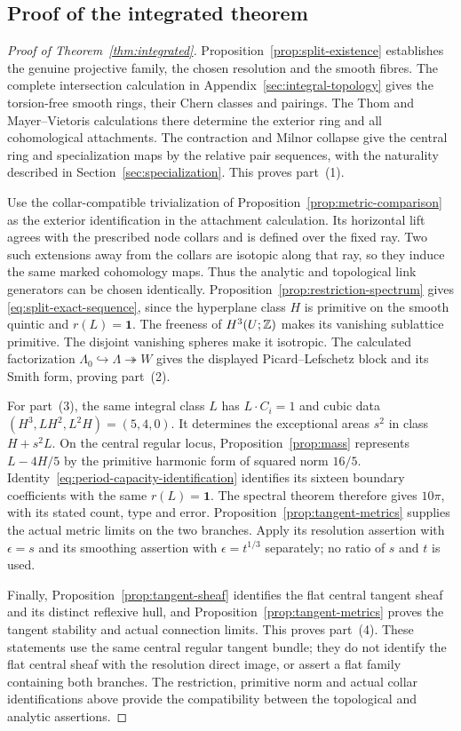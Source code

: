 \subsection{Proof of the integrated theorem}
\begin{proof}[Proof of Theorem~\ref{thm:integrated}]
Proposition~\ref{prop:split-existence} establishes the genuine projective
family, the chosen resolution and the smooth fibres. The complete
intersection calculation in Appendix~\ref{sec:integral-topology} gives the
torsion-free smooth rings, their Chern classes and pairings. The Thom
and Mayer--Vietoris calculations there determine the exterior ring and
all cohomological attachments. The contraction and Milnor collapse
give the central ring and specialization maps by the relative pair
sequences, with the naturality described in
Section~\ref{sec:specialization}. This proves part~(1).

Use the collar-compatible trivialization of
Proposition~\ref{prop:metric-comparison} as the exterior identification
in the attachment calculation. Its horizontal lift agrees with the
prescribed node collars and is defined over the fixed ray. Two such
extensions away from the collars are isotopic along that ray, so they
induce the same marked cohomology maps. Thus the analytic and
topological link generators can be chosen identically.
Proposition~\ref{prop:restriction-spectrum} gives
\eqref{eq:split-exact-sequence}, since the hyperplane class $H$ is
primitive on the smooth quintic and $r(L)=\mathbf1$.
The freeness of $H^3(U;\mathbb Z)$ makes its vanishing sublattice primitive.
The disjoint vanishing spheres make it isotropic. The calculated
factorization $\Lambda_0\hookrightarrow\Lambda\twoheadrightarrow W$ gives
the displayed Picard--Lefschetz block and its Smith form, proving
part~(2).

For part~(3), the same integral class $L$ has
$L\cdot C_i=1$ and cubic data $(H^3,LH^2,L^2H)=(5,4,0)$.
It determines the exceptional areas $s^2$ in class $H+s^2L$.
On the central regular locus, Proposition~\ref{prop:mass} represents
$L-4H/5$ by the primitive harmonic form of squared norm $16/5$.
Identity~\eqref{eq:period-capacity-identification} identifies its
sixteen boundary coefficients with the same $r(L)=\mathbf1$.
The spectral theorem therefore gives $10\pi$, with its stated
count, type and error. Proposition~\ref{prop:tangent-metrics}
supplies the actual metric limits on the two branches. Apply its
resolution assertion with $\epsilon=s$ and its smoothing assertion
with $\epsilon=t^{1/3}$ separately; no ratio of $s$ and $t$ is used.

Finally, Proposition~\ref{prop:tangent-sheaf} identifies the flat
central tangent sheaf and its distinct reflexive hull, and
Proposition~\ref{prop:tangent-metrics} proves the tangent stability
and actual connection limits. This proves part~(4). These statements
use the same central regular tangent bundle; they do not identify
the flat central sheaf with the resolution direct image, or assert a
flat family containing both branches. The restriction, primitive norm
and actual collar identifications above provide the compatibility
between the topological and analytic assertions.
\end{proof}
